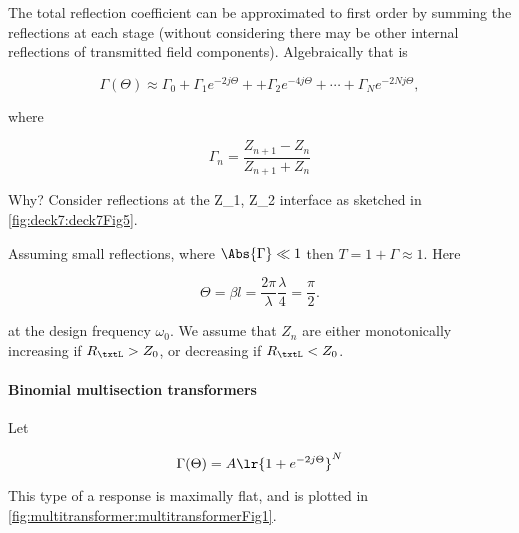The total reflection coefficient can be approximated to first order by summing the reflections at each stage (without considering there may be other internal reflections of transmitted field components).  Algebraically that is

\begin{equation}\label{eqn:uwavesDeck7MultisectionTransformersCore:60}
\Gamma(\Theta) \approx \Gamma_0 
+ \Gamma_1 e^{-2 j \Theta} + 
+ \Gamma_2 e^{-4 j \Theta} +  \cdots
+ \Gamma_N e^{-2 N j \Theta},
\end{equation}

where

\begin{equation}\label{eqn:uwavesDeck7MultisectionTransformersCore:80}
\Gamma_n = \frac{Z_{n+1} - Z_n}{Z_{n+1} + Z_n}
\end{equation}

Why?  Consider reflections at the Z_1, Z_2 interface as sketched in \cref{fig:deck7:deck7Fig5}.


Assuming small reflections, where \( \Abs{\Gamma} \ll 1 \) then \( T = 1 + \Gamma \approx 1 \).  Here

\begin{dmath}\label{eqn:uwavesDeck7MultisectionTransformersCore:100}
\Theta 
= \beta l 
= \frac{2 \pi}{\lambda} \frac{\lambda}{4} 
= \frac{\pi}{2}.
\end{dmath}

at the design frequency \( \omega_0 \).  We assume that \( Z_n \) are either monotonically increasing if \( R_\txtL > Z_0 \), or decreasing if \( R_\txtL < Z_0 \).

\paragraph{Binomial multisection transformers}

Let

\begin{equation}\label{eqn:uwavesDeck7MultisectionTransformersCore:120}
\Gamma(\Theta) = A \lr{ 1 + e^{-2 j \Theta} }^N
\end{equation}

This type of a response is maximally flat, and is plotted in \cref{fig:multitransformer:multitransformerFig1}.

